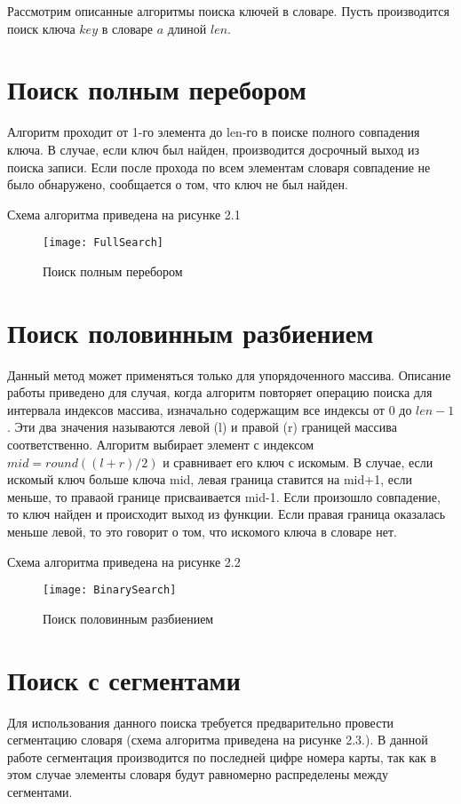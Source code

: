 Рассмотрим описанные алгоритмы поиска ключей в словаре. Пусть производится поиск ключа $key$ в словаре $a$ длиной $len$.

\section{Поиск полным перебором}
Алгоритм проходит от 1-го элемента до len-го в поиске полного совпадения ключа. В случае, если ключ был найден, производится досрочный выход из поиска записи. Если после прохода по всем элементам словаря совпадение не было обнаружено, сообщается о том, что ключ не был найден.

Схема алгоритма приведена на рисунке 2.1
\begin{figure}[h]
	\begin{center}
		{\texttt{[image: FullSearch]}}
		\caption{Поиск полным перебором}
	\end{center}
\end{figure}

\section{Поиск половинным разбиением}
Данный метод может применяться только для упорядоченного массива. Описание работы приведено для случая, когда алгоритм повторяет операцию поиска для интервала индексов массива, изначально содержащим все индексы от 0 до $len-1$. Эти два значения называются левой (l) и правой (r) границей массива соответственно. Алгоритм выбирает элемент с индексом $mid = round((l+r)/2)$ и сравнивает его ключ с искомым. В случае, если искомый ключ больше ключа mid, левая граница ставится на mid+1, если меньше, то праваой границе присваивается mid-1. Если произошло совпадение, то ключ найден и происходит выход из функции. Если правая граница оказалась меньше левой, то это говорит о том, что искомого ключа в словаре нет.

Схема алгоритма приведена на рисунке 2.2
\begin{figure}[h]
	\begin{center}
		{\texttt{[image: BinarySearch]}}
		\caption{Поиск половинным разбиением}
	\end{center}
\end{figure}

\section{Поиск с сегментами}
Для использования данного поиска требуется предварительно провести сегментацию словаря (схема алгоритма приведена на рисунке 2.3.). В данной работе сегментация производится по последней цифре номера карты, так как в этом случае элементы словаря будут равномерно распределены между сегментами.

